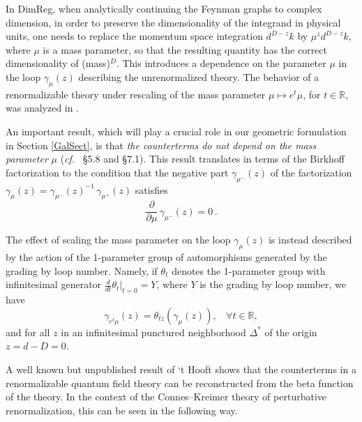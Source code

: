 \documentclass[10pt]{amsart}
\def\R{{\mathbb R}}
\def\g{\gamma}
\newcommand{\cf}{{\it cf.\/}\ }
\numberwithin{equation}{section}
\begin{document}
In DimReg, when analytically continuing the Feynman graphs to complex
dimension, in order to preserve the dimensionality of the integrand in
physical units, one needs to replace the momentum space integration
$d^{D-z}k$ by $\mu^z d^{D-z} k$, where $\mu$ is a mass parameter, so
that the resulting quantity has the correct dimensionality of
(mass)$^D$. This introduces a dependence on the parameter $\mu$ in the
loop $\gamma_\mu(z)$ describing the unrenormalized theory. The
behavior of a renormalizable theory under rescaling of the mass
parameter $\mu \mapsto e^t\mu$, for $t\in \R$, was analyzed in
\cite{tH}.

\smallskip

An important result, which will play a crucial role in our geometric
formulation in Section \ref{GalSect}, is that {\em the counterterms do
not depend on the mass parameter} $\mu$ (\cf
\cite{Collins} \S 5.8 and \S 7.1). This result translates in terms of the
Birkhoff factorization to the condition that the negative part
$\gamma_{\mu^-}(z)$ of the factorization $\g_{\mu} (z) = \g_{\mu^-}
(z)^{-1} \, \g_{\mu^+} (z)$ satisfies
\begin{equation}
 \frac{\partial}{\partial \mu} \, \g_{\mu^-} (z) = 0 \, . \label{gammamu-}
\end{equation}

\smallskip

The effect of scaling the mass parameter on the loop $\gamma_\mu(z)$
is instead described by the action of the 1-parameter group of
automorphisms generated by the grading by loop number. Namely, if
$\theta_t$ denotes the 1-parameter group with infinitesimal generator
$\frac{d}{dt}\theta_t|_{t=0}=Y$, where $Y$ is the grading by loop
number, we have
\begin{equation}\label{thetagamma}
\gamma_{e^t\mu}(z) =\theta_{tz}(\gamma_\mu(z)) , \ \ \ \  \forall t\in
\R,
\end{equation}
and for all $z$ in an infinitesimal punctured neighborhood $\Delta^*$
of the origin $z=d-D=0$.

\smallskip

A well known but unpublished result of `t Hooft shows that the counterterms
in a renormalizable
quantum field theory can be reconstructed from the beta function of
the theory. In the context of the Connes--Kreimer theory of
perturbative renormalization, this can be seen in the following way.

\smallskip
\end{document}
